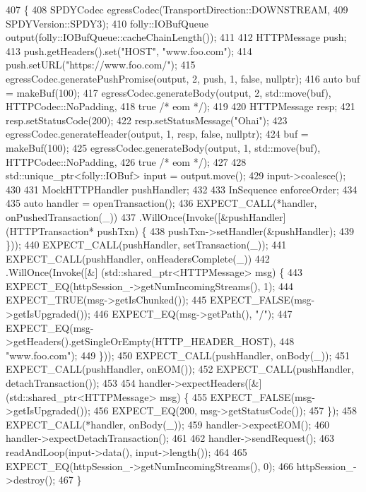 \begin{DoxyCode}
407                                              \{
408   SPDYCodec egressCodec(TransportDirection::DOWNSTREAM,
409                         SPDYVersion::SPDY3);
410   folly::IOBufQueue output(folly::IOBufQueue::cacheChainLength());
411 
412   HTTPMessage push;
413   push.getHeaders().set(\textcolor{stringliteral}{"HOST"}, \textcolor{stringliteral}{"www.foo.com"});
414   push.setURL(\textcolor{stringliteral}{"https://www.foo.com/"});
415   egressCodec.generatePushPromise(output, 2, push, 1, \textcolor{keyword}{false}, \textcolor{keyword}{nullptr});
416   \textcolor{keyword}{auto} buf = makeBuf(100);
417   egressCodec.generateBody(output, 2, std::move(buf), HTTPCodec::NoPadding,
418                            \textcolor{keyword}{true} \textcolor{comment}{/* eom */});
419 
420   HTTPMessage resp;
421   resp.setStatusCode(200);
422   resp.setStatusMessage(\textcolor{stringliteral}{"Ohai"});
423   egressCodec.generateHeader(output, 1, resp, \textcolor{keyword}{false}, \textcolor{keyword}{nullptr});
424   buf = makeBuf(100);
425   egressCodec.generateBody(output, 1, std::move(buf), HTTPCodec::NoPadding,
426                            \textcolor{keyword}{true} \textcolor{comment}{/* eom */});
427 
428   std::unique\_ptr<folly::IOBuf> input = output.move();
429   input->coalesce();
430 
431   MockHTTPHandler pushHandler;
432 
433   InSequence enforceOrder;
434 
435   \textcolor{keyword}{auto} handler = openTransaction();
436   EXPECT\_CALL(*handler, onPushedTransaction(\_))
437     .WillOnce(Invoke([&pushHandler] (HTTPTransaction* pushTxn) \{
438           pushTxn->setHandler(&pushHandler);
439         \}));
440   EXPECT\_CALL(pushHandler, setTransaction(\_));
441   EXPECT\_CALL(pushHandler, onHeadersComplete(\_))
442     .WillOnce(Invoke([&] (std::shared\_ptr<HTTPMessage> msg) \{
443           EXPECT\_EQ(httpSession\_->getNumIncomingStreams(), 1);
444           EXPECT\_TRUE(msg->getIsChunked());
445           EXPECT\_FALSE(msg->getIsUpgraded());
446           EXPECT\_EQ(msg->getPath(), \textcolor{stringliteral}{"/"});
447           EXPECT\_EQ(msg->getHeaders().getSingleOrEmpty(HTTP\_HEADER\_HOST),
448                     \textcolor{stringliteral}{"www.foo.com"});
449         \}));
450   EXPECT\_CALL(pushHandler, onBody(\_));
451   EXPECT\_CALL(pushHandler, onEOM());
452   EXPECT\_CALL(pushHandler, detachTransaction());
453 
454   handler->expectHeaders([&] (std::shared\_ptr<HTTPMessage> msg) \{
455       EXPECT\_FALSE(msg->getIsUpgraded());
456       EXPECT\_EQ(200, msg->getStatusCode());
457     \});
458   EXPECT\_CALL(*handler, onBody(\_));
459   handler->expectEOM();
460   handler->expectDetachTransaction();
461 
462   handler->sendRequest();
463   readAndLoop(input->data(), input->length());
464 
465   EXPECT\_EQ(httpSession\_->getNumIncomingStreams(), 0);
466   httpSession\_->destroy();
467 \}
\end{DoxyCode}
